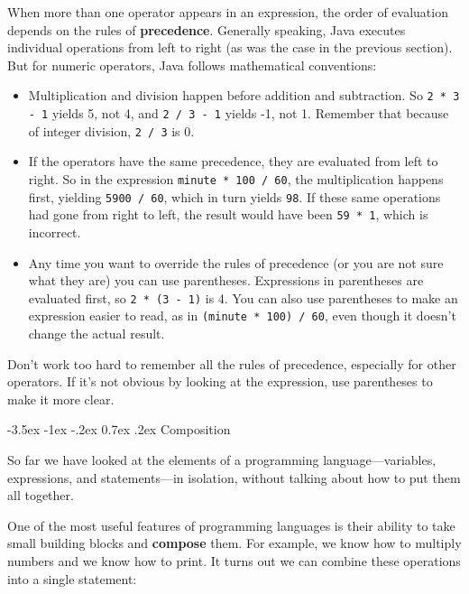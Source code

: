 \documentclass[12pt]{book}
\makeatletter
\renewcommand{\section}{\@startsection {section}{1}{\z@}%
    {-3.5ex \@plus -1ex \@minus -.2ex}%
    {0.7ex \@plus.2ex}%
    {\normalfont\Large\bfseries}}
\theoremstyle{exercise}
\newcommand{\java}[1]{\lstinline{#1}} %
\makeatother
\begin{document}

When more than one operator appears in an expression, the order of evaluation depends on the rules of {\bf precedence}.
Generally speaking, Java executes individual operations from left to right (as was the case in the previous section).
But for numeric operators, Java follows mathematical conventions:

\begin{itemize}

\item Multiplication and division happen before addition and subtraction.
So \java{2 * 3 - 1} yields 5, not 4, and \java{2 / 3 - 1} yields -1, not 1.
Remember that because of integer division, \java{2 / 3} is 0.

\item If the operators have the same precedence, they are evaluated from left to right.
So in the expression \java{minute * 100 / 60}, the multiplication happens first, yielding \java{5900 / 60}, which in turn yields \java{98}.
If these same operations had gone from right to left, the result would have been \java{59 * 1}, which is incorrect.

\item Any time you want to override the rules of precedence (or you are not sure what they are) you can use parentheses.
Expressions in parentheses are evaluated first, so \java{2 * (3 - 1)} is 4.
You can also use parentheses to make an expression easier to read, as in \java{(minute * 100) / 60}, even though it doesn't change the actual result.

\end{itemize}

Don't work too hard to remember all the rules of precedence, especially for other operators.
If it's not obvious by looking at the expression, use parentheses to make it more clear.


\section{Composition}


So far we have looked at the elements of a programming language---variables, expressions, and statements---in isolation, without talking about how to put them all together.

One of the most useful features of programming languages is their ability to take small building blocks and {\bf compose} them.
For example, we know how to multiply numbers and we know how to print.
It turns out we can combine these operations into a single statement:
\end{document}
